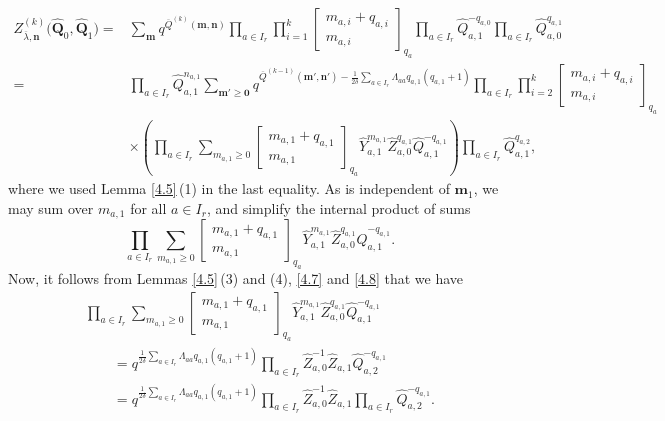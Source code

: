 \documentclass[pdftex]{sigma}
\numberwithin{equation}{section}
\begin{document}
\begin{align}
Z_{\overline{\lambda},\mathbf{n}}^{(k)}\bigl(\widehat{\mathbf{Q}}_0,\widehat{\mathbf{Q}}_1\bigr)
={}&\sum_{\mathbf{m}}q^{\overline{Q}^{(k)}(\mathbf{m},\mathbf{n})}\prod_{a\in I_r}\prod_{i=1}^k\begin{bmatrix}m_{a,i}+q_{a,i}\\m_{a,i}\end{bmatrix}_{q_a}\prod_{a\in I_r}\widehat{Q}_{a,1}^{-q_{a,0}}\prod_{a\in I_r}\widehat{Q}_{a,0}^{q_{a,1}}\nonumber\\
={}&\prod_{a\in I_r}\widehat{Q}_{a,1}^{n_{a,1}}\sum_{\mathbf{m}'\geq\mathbf{0}}q^{\overline{Q}^{(k-1)}(\mathbf{m}',\mathbf{n}')-\frac{1}{2\delta}\sum_{a\in I_r}\Lambda_{aa}q_{a,1}(q_{a,1}+1)}\prod_{a\in I_r}\prod_{i=2}^k\begin{bmatrix}m_{a,i}+q_{a,i}\\m_{a,i}\end{bmatrix}_{q_a}\nonumber\\
&\times\left(\prod_{a\in I_r}\sum_{m_{a,1}\geq0}\begin{bmatrix}m_{a,1}+q_{a,1}\\m_{a,1}\end{bmatrix}_{q_a}\widehat{Y}_{a,1}^{m_{a,1}}\widehat{Z}_{a,0}^{q_{a,1}}\widehat{Q}_{a,1}^{-q_{a,1}}\right)\prod_{a\in I_r}\widehat{Q}_{a,1}^{q_{a,2}},\label{eq:4.20}
\end{align}
where we used Lemma \ref{4.5}\,(1) in the last equality. As  is independent of $\mathbf{m}_1$, we may sum over $m_{a,1}$ for all $a\in I_r$, and simplify the internal product of sums
\begin{equation*}
\prod_{a\in I_r}\sum_{m_{a,1}\geq0}\begin{bmatrix}m_{a,1}+q_{a,1}\\m_{a,1}\end{bmatrix}_{q_a}\widehat{Y}_{a,1}^{m_{a,1}}\widehat{Z}_{a,0}^{q_{a,1}}\widehat{Q}_{a,1}^{-q_{a,1}}.
\end{equation*}
Now, it follows from Lemmas \ref{4.5}\,(3) and (4), \ref{4.7} and \ref{4.8} that we have
\begin{gather}
\prod_{a\in I_r}\sum_{m_{a,1}\geq0}\begin{bmatrix}m_{a,1}+q_{a,1}\\m_{a,1}\end{bmatrix}_{q_a}\widehat{Y}_{a,1}^{m_{a,1}}\widehat{Z}_{a,0}^{q_{a,1}}\widehat{Q}_{a,1}^{-q_{a,1}}\nonumber\\
\qquad=q^{\frac{1}{2\delta}\sum_{a\in I_r}\Lambda_{aa}q_{a,1}(q_{a,1}+1)}\prod_{a\in I_r}\widehat{Z}_{a,0}^{-1}\widehat{Z}_{a,1}\widehat{Q}_{a,2}^{-q_{a,1}}\nonumber\\
\qquad=q^{\frac{1}{2\delta}\sum_{a\in I_r}\Lambda_{aa}q_{a,1}(q_{a,1}+1)}\prod_{a\in I_r}\widehat{Z}_{a,0}^{-1}\widehat{Z}_{a,1}\prod_{a\in I_r}\widehat{Q}_{a,2}^{-q_{a,1}}.\label{eq:4.21}
\end{gather}
\end{document}
